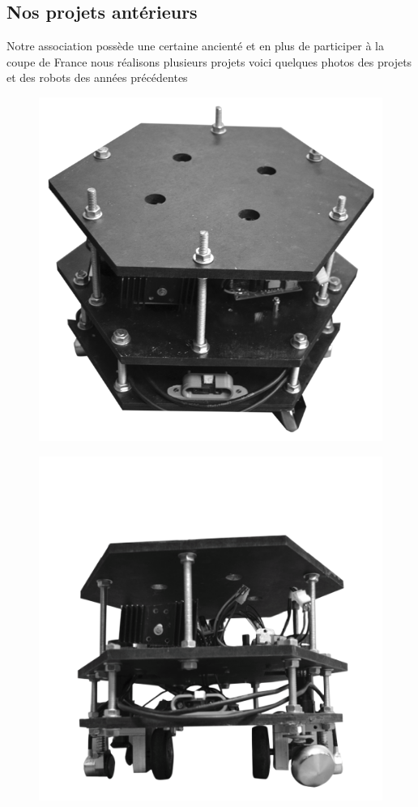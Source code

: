 \documentclass[a4paper,10pt]{article}
\begin{document}
\begin{spacing}{1.5}
\section*{Nos projets antérieurs}
Notre association possède une certaine ancienté et en plus de participer à la
coupe de France nous réalisons plusieurs projets voici quelques photos des
projets et des robots des années précédentes
\begin{multicols}{2}
  \begin{figure}[H]
    \center
    \includegraphics[scale=0.3]{1A2018.png}
  \end{figure}
  \columnbreak
  \begin{figure}[H]
    \center
    \includegraphics[scale=0.3]{1A2018_2.png}
  \end{figure}
\end{multicols}


\end{spacing}
\end{document}
